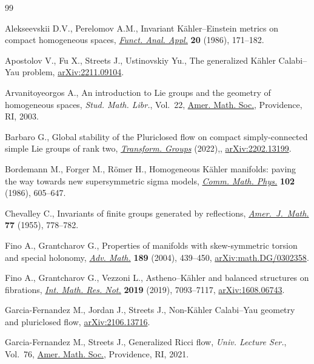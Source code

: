 \begin{thebibliography}{99}
\footnotesize\itemsep=0pt

Alekseevskii D.V., Perelomov A.M., Invariant {K}\"ahler--{E}instein metrics on
 compact homogeneous spaces, \href{https://doi.org/10.1007/BF01078469}{\textit{Funct. Anal. Appl.}} \textbf{20} (1986),
 171--182.

Apostolov V., Fu X., Streets J., Ustinovskiy Yu., The generalized K\"ahler
 Calabi--Yau problem, \href{https://arxiv.org/abs/2211.09104}{arXiv:2211.09104}.

Arvanitoyeorgos A., An introduction to {L}ie groups and the geometry of
 homogeneous spaces, \textit{Stud. Math. Libr.}, Vol.~22, \href{https://doi.org/10.1090/stml/022}{Amer. Math. Soc.},
 Providence, RI, 2003.

Barbaro G., Global stability of the {P}luriclosed flow on compact
 simply-connected simple {L}ie groups of rank two, \href{https://doi.org/10.1007/s00031-022-09761-5}{\textit{Transform. Groups}}
 (2022),, \href{https://arxiv.org/abs/2202.13199}{arXiv:2202.13199}.

Bordemann M., Forger M., R\"omer H., Homogeneous {K}\"ahler manifolds: paving
 the way towards new supersymmetric sigma models, \href{https://doi.org/10.1007/BF01221650}{\textit{Comm. Math. Phys.}}
 \textbf{102} (1986), 605--647.

Chevalley C., Invariants of finite groups generated by reflections,
 \href{https://doi.org/10.2307/2372597}{\textit{Amer.~J.~Math.}} \textbf{77} (1955), 778--782.

Fino A., Grantcharov G., Properties of manifolds with skew-symmetric torsion
 and special holonomy, \href{https://doi.org/10.1016/j.aim.2003.10.009}{\textit{Adv. Math.}} \textbf{189} (2004), 439--450,
 \href{https://arxiv.org/abs/math.DG/0302358}{arXiv:math.DG/0302358}.

Fino A., Grantcharov G., Vezzoni L., Astheno--{K}\"ahler and balanced
 structures on fibrations, \href{https://doi.org/10.1093/imrn/rnx337}{\textit{Int. Math. Res. Not.}} \textbf{2019} (2019),
 7093--7117, \href{https://arxiv.org/abs/1608.06743}{arXiv:1608.06743}.

Garcia-Fernandez M., Jordan J., Streets J., Non-{K}\"ahler {C}alabi--{Y}au
 geometry and pluriclosed flow, \href{https://arxiv.org/abs/2106.13716}{arXiv:2106.13716}.

Garcia-Fernandez M., Streets J., Generalized {R}icci flow, \textit{Univ.
 Lecture Ser.}, Vol.~76, \href{https://doi.org/10.1090/ulect/076}{Amer. Math. Soc.}, Providence, RI, 2021.


\end{thebibliography}
